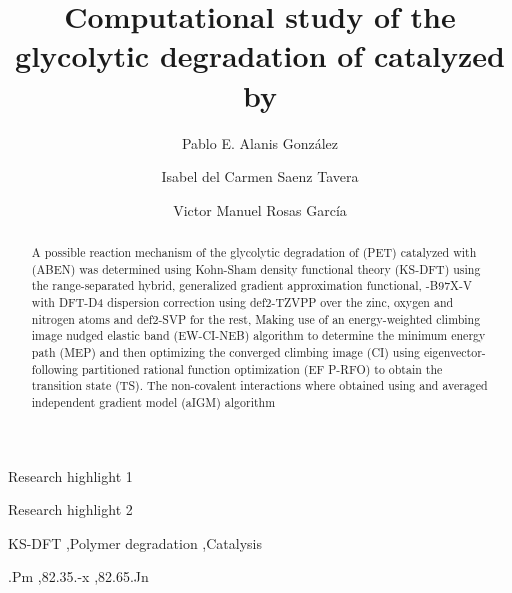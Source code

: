 \begin{frontmatter}

    \title{Computational study of the glycolytic degradation of  catalyzed by }

    \author[1]{Pablo E. Alanis González}

    \author[1]{Isabel del Carmen Saenz Tavera}

    \author[1]{Victor Manuel Rosas García}


    \begin{abstract}
        A possible reaction mechanism of the glycolytic degradation of  (PET) catalyzed with  (ABEN) was determined using Kohn-Sham density functional theory (KS-DFT) using the range-separated hybrid, generalized gradient approximation functional, \chemomega-B97X-V with DFT-D4 dispersion correction \cite{Mardirossian2014} using def2-TZVPP over the zinc, oxygen and nitrogen atoms and def2-SVP for the rest, Making use of an energy-weighted climbing image nudged elastic band (EW-CI-NEB) algorithm \cite{Asgeirsson2021} to determine the minimum energy path (MEP) and then optimizing the converged climbing image (CI) using eigenvector-following partitioned rational function optimization (EF P-RFO) to obtain the transition state (TS). The non-covalent interactions where obtained using and averaged independent gradient model (aIGM) algorithm \cite{Lefebvre2018}
    \end{abstract}

    \begin{graphicalabstract}
    \end{graphicalabstract}

    \begin{highlights}
        \item Research highlight 1
        \item Research highlight 2
    \end{highlights}

    \begin{keyword}

        KS-DFT \sep Polymer degradation \sep Catalysis

        .Pm \sep 82.35.-x \sep 82.65.Jn
    \end{keyword}

\end{frontmatter}